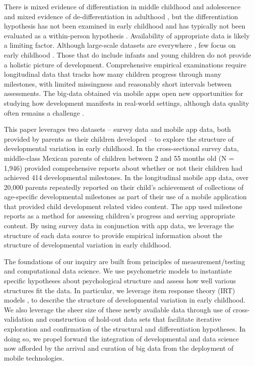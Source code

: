 \documentclass[man, floatsintext]{apa7}
\begin{document}
There is mixed evidence of differentiation in middle childhood and adolescence \parencite{juan-espinosa2006,shing2010,breit2020}
and mixed evidence of de-differentiation in adulthood \parencite{hartung2018,li2004}, but the
differentiation hypothesis has not been examined in early childhood and
has typically not been evaluated as a within-person hypothesis \parencite[see][as an exception]{hulur2015}. Availability of appropriate data is likely a limiting
factor. Although large-scale datasets are everywhere \cite{tsai2015}, few
focus on early childhood \parencite[cf.][]{mindell2016,milne-ives2020}.  Those that do include infants and young children do not provide a
holistic picture of development. Comprehensive empirical
examinations require longitudinal data that tracks how many children
progress through many milestones, with limited missingness and
reasonably short intervals between assessments. The big-data obtained
via mobile apps open new opportunities for studying how development
manifests in real-world settings, although data quality often remains a
challenge \parencite{milne-ives2020}.

This paper leverages two datasets -- survey data and mobile app data, both provided by parents as their children developed -- to explore
the structure of developmental variation in early childhood. In the
cross-sectional survey data, middle-class Mexican parents of children
between 2 and 55 months old (N = 1,946) provided comprehensive reports
about whether or not their children had achieved 414 developmental
milestones. In the longitudinal mobile app data, over 20,000 parents
repeatedly reported on their child's achievement of collections of
age-specific developmental milestones as part of their use of a mobile
application that provided child development related video content. The
app used milestone reports as a method for assessing children's progress
and serving appropriate content. By using survey data in conjunction
with app data, we leverage the structure of each data source to provide
empirical information about the structure of developmental variation
in early childhood.

The foundations of our inquiry are built from  principles of
measurement/testing and computational data science. We use psychometric
models to instantiate specific hypotheses about psychological structure
and assess how well various structures ﬁt the data. In particular, we
leverage item response theory (IRT) models \parencite[first developed by
Educational Testing Service to measure students' academic performance;][]{lord1980}, to describe the structure of developmental variation in early
childhood. We also leverage the sheer size of these newly available data
through use of cross-validation and construction of hold-out data sets
that facilitate iterative exploration and confirmation of the structural
and differentiation hypotheses. In doing so, we propel forward the
integration of developmental and data science now afforded by the
arrival and curation of big data from the deployment of mobile technologies.
\end{document}
